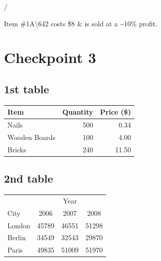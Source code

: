 \documentclass[a4paper,12pt]{article}
\begin{document}
\vspace{12pt}
/

\vspace{70pt}
Item \#1A\textbackslash642 costs \$8 \& is sold at a \~{}10\% profit.

\vspace{50pt}
\section{Checkpoint 3}

\subsection{1st table}
\begin{table}[h]
    \centering
    \begin{tabular}{l|r|r}
    Item    &   Quantity   &    Price (\$)\\
    \hline
    Nails   &   500    &    0.34   \\
    Wooden Boards   &   100    &    4.00   \\
    Bricks  &   240    &    11.50   \\

    \end{tabular}

\end{table}

\newpage

\subsection{2nd table}
\begin{table}[h]
    \centering
    \begin{tabular}{l|ccc}
        &  \multicolumn{3}{|c}{Year} \\
        \cline{2-4}
        City &  2006    &   2007    &   2008\\
        \hline
        London  & 45789 & 46551 & 51298 \\
        Berlin  & 34549 & 32543 & 29870 \\
        Paris   & 49835 & 51009 & 51970 \\
    \end{tabular}    
\end{table}
\end{document}
